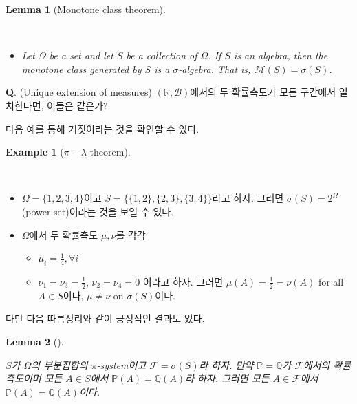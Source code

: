 \documentclass[
  letterpaper,
  DIV=11,
  numbers=noendperiod]{scrreprt}
\providecommand{\tightlist}{%
  \setlength{\itemsep}{0pt}\setlength{\parskip}{0pt}}
\theoremstyle{definition}
\theoremstyle{plain}
\theoremstyle{plain}
\theoremstyle{definition}
\newtheorem{example}{Example}[chapter]
\theoremstyle{plain}
\newtheorem{lemma}{Lemma}[chapter]
\theoremstyle{definition}
\theoremstyle{remark}
\begin{document}
\begin{lemma}[Monotone class
theorem]\protect\hypertarget{lem-monotoneclassthm}{}\label{lem-monotoneclassthm}

~

\begin{itemize}
\tightlist
\item
  Let \(\Omega\) be a set and let \(S\) be a collection of \(\Omega\).
  If \(S\) is an algebra, then the monotone class generated by \(S\) is
  a \(\sigma\)-algebra. That is, \(\mathcal{M}(S) = \sigma(S)\).
\end{itemize}

\end{lemma}

\textbf{Q}. (Unique extension of measures)
\((\mathbb{R}, \mathcal{B})\)에서의 두 확률측도가 모든 구간에서
일치한다면, 이들은 같은가?

다음 예를 통해 거짓이라는 것을 확인할 수 있다.

\begin{example}[\(\pi-\lambda\)
theorem]\protect\hypertarget{exm-differentprobmeasures}{}\label{exm-differentprobmeasures}

~

\begin{itemize}
\item
  \(\Omega = \{1,2,3,4\}\)이고 \(S = \{\{1,2\},\{2,3\},\{3,4\}\}\)라고
  하자. 그러면 \(\sigma (S) = 2^{\Omega}\) (power set)이라는 것을 보일
  수 있다.
\item
  \(\Omega\)에서 두 확률측도 \(\mu, \nu\)를 각각

  \begin{itemize}
  \tightlist
  \item
    \(\mu_i = \frac{1}{4}, \forall i\)
  \item
    \(\nu_1 = \nu_3 =\frac{1}{2}\), \(\nu_2 = \nu_4 = 0\) 이라고 하자.
    그러면 \(\mu(A)=\frac{1}{2}=\nu (A)\) for all \(A \in S\)이나,
    \(\mu \neq \nu\) on \(\sigma (S)\)이다.
  \end{itemize}
\end{itemize}

\end{example}

다만 다음 따름정리와 같이 긍정적인 결과도 있다.

\begin{lemma}[]\protect\hypertarget{lem-pisysequivprob}{}\label{lem-pisysequivprob}

\(S\)가 \(\Omega\)의 부분집합의 \(\pi\)-system이고
\(\mathcal{F} = \sigma (S)\)라 하자. 만약 \(\mathbb{P} = \mathbb{Q}\)가
\(\mathcal{F}\)에서의 확률측도이며 모든 \(A \in S\)에서
\(\mathbb{P}(A) =\mathbb{Q}(A)\)라 하자. 그러면 모든
\(A\in \mathcal{F}\)에서 \(\mathbb{P}(A) =\mathbb{Q}(A)\)이다.

\end{lemma}
\end{document}
